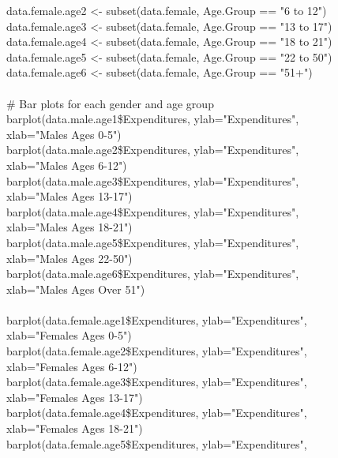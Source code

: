 \documentclass[12pt,letterpaper]{article}
\begin{document}
{		data.female.age2 <- subset(data.female, Age.Group == "6 to 12")\\
		data.female.age3 <- subset(data.female, Age.Group == "13 to 17")\\
		data.female.age4 <- subset(data.female, Age.Group == "18 to 21")\\
		data.female.age5 <- subset(data.female, Age.Group == "22 to 50")\\
		data.female.age6 <- subset(data.female, Age.Group == "51+")\\
		\ \\
		\# Bar plots for each gender and age group\\
		barplot(data.male.age1\$Expenditures, ylab="Expenditures",\\
		\indent xlab="Males Ages 0-5")\\
		barplot(data.male.age2\$Expenditures, ylab="Expenditures",\\
		\indent xlab="Males Ages 6-12")\\
		barplot(data.male.age3\$Expenditures, ylab="Expenditures",\\
		\indent xlab="Males Ages 13-17")\\
		barplot(data.male.age4\$Expenditures, ylab="Expenditures",\\
		\indent xlab="Males Ages 18-21")\\
		barplot(data.male.age5\$Expenditures, ylab="Expenditures",\\
		\indent xlab="Males Ages 22-50")\\
		barplot(data.male.age6\$Expenditures, ylab="Expenditures",\\
		\indent xlab="Males Ages Over 51")\\
		\ \\
		barplot(data.female.age1\$Expenditures, ylab="Expenditures",\\
		\indent xlab="Females Ages 0-5")\\
		barplot(data.female.age2\$Expenditures, ylab="Expenditures",\\
		\indent xlab="Females Ages 6-12")\\
		barplot(data.female.age3\$Expenditures, ylab="Expenditures",\\
		\indent xlab="Females Ages 13-17")\\
		barplot(data.female.age4\$Expenditures, ylab="Expenditures",\\
		\indent xlab="Females Ages 18-21")\\
		barplot(data.female.age5\$Expenditures, ylab="Expenditures",\\
}
\end{document}

